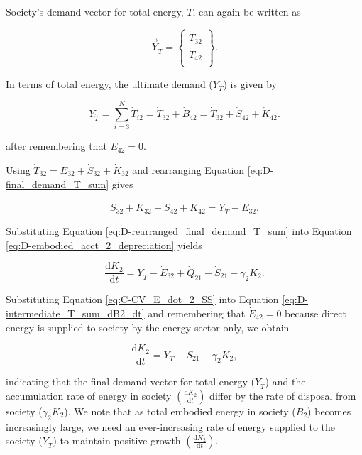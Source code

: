 Society's demand vector for total energy, $\dot{T}$, can again be written as 

\begin{equation} \label{eq:D-demand_vector_T_dot}
	\vec{Y}_{\dot{T}} = 	\begin{Bmatrix} 	\dot{T}_{32}	\\
																\dot{T}_{42}	\\
									\end{Bmatrix}.
\end{equation}

\noindent In terms of total energy, the ultimate demand ($Y_{\dot{T}}$) is given by 

\begin{equation} \label{eq:D-final_demand_T_sum}
	Y_{\dot{T}} = 	\sum_{i=3}^{N} \dot{T}_{i2} = \dot{T}_{32} + \dot{B}_{42} = \dot{T}_{32} + \dot{S}_{42} + \dot{K}_{42}.
\end{equation}

\noindent after remembering that $\dot{E}_{42} = 0$.

Using $\dot{T}_{32} = \dot{E}_{32} + \dot{S}_{32} + \dot{K}_{32}$ and rearranging Equation \ref{eq:D-final_demand_T_sum} gives

\begin{equation} \label{eq:D-rearranged_final_demand_T_sum}
	\dot{S}_{32} +\dot{K}_{32} + \dot{S}_{42} + \dot{K}_{42} = Y_{\dot{T}} - \dot{E}_{32}.
\end{equation}

\noindent Substituting Equation \ref{eq:D-rearranged_final_demand_T_sum} into Equation \ref{eq:D-embodied_acct_2_depreciation} yields

\begin{equation} \label{eq:D-intermediate_T_sum_dB2_dt}
	\frac{\mathrm{d}K_2}{\mathrm{d}t} = Y_{\dot{T}} - \dot{E}_{32} + \dot{Q}_{21} - \dot{S}_{21} - \gamma_2 K_2.
\end{equation}

Substituting Equation \ref{eq:C-CV_E_dot_2_SS} into Equation \ref{eq:D-intermediate_T_sum_dB2_dt} and remembering that $\dot{E}_{42} = 0$ because direct energy is supplied to society by the energy sector only, we obtain 

\begin{equation} \label{eq:D-compare_demand_and_accumulation}
	\frac{\mathrm{d}K_{2}}{\mathrm{d}t} = Y_{\dot{T}} - \dot{S}_{21} - \gamma_{2}K_{2},
\end{equation}

\noindent indicating that the final demand vector for total energy ($Y_{\dot{T}}$) and the accumulation rate of energy in society $\left(\frac{\mathrm{d}K_{2}}{\mathrm{d}t}\right)$ differ by the rate of disposal from society ($\gamma_{2}K_{2}$). We note that as total embodied energy in society ($B_{2}$) becomes increasingly large, we need an ever-increasing rate of energy supplied to the society ($Y_{\dot{T}}$) to maintain positive growth $\left(\frac{\mathrm{d}K_{2}}{\mathrm{d}t}\right)$. 

